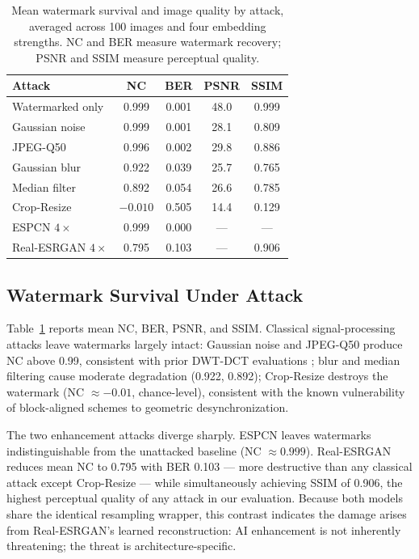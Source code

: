 \documentclass[conference]{IEEEtran}
\begin{document}
\begin{table}[t]
\caption{Mean watermark survival and image quality by attack, averaged
across 100 images and four embedding strengths. NC and BER measure
watermark recovery; PSNR and SSIM measure perceptual quality.}
\label{tab:survival}
\centering
\begin{tabular}{lcccc}
\toprule
Attack & NC & BER & PSNR & SSIM \\
\midrule
Watermarked only       & 0.999  & 0.001 & 48.0 & 0.999 \\
Gaussian noise         & 0.999  & 0.001 & 28.1 & 0.809 \\
JPEG-Q50               & 0.996  & 0.002 & 29.8 & 0.886 \\
Gaussian blur          & 0.922  & 0.039 & 25.7 & 0.765 \\
Median filter          & 0.892  & 0.054 & 26.6 & 0.785 \\
Crop-Resize            & $-0.010$ & 0.505 & 14.4 & 0.129 \\
ESPCN $4\times$        & 0.999  & 0.000 & ---  & ---  \\
Real-ESRGAN $4\times$  & 0.795  & 0.103 & ---  & 0.906 \\
\bottomrule
\end{tabular}
\end{table}

\subsection{Watermark Survival Under Attack}
Table~\ref{tab:survival} reports mean NC, BER, PSNR, and SSIM.
Classical signal-processing attacks leave watermarks largely intact:
Gaussian noise and JPEG-Q50 produce NC above 0.99, consistent with prior
DWT-DCT evaluations \cite{alhaj2007}; blur and median filtering cause
moderate degradation (0.922, 0.892); Crop-Resize destroys the watermark
(NC $\approx -0.01$, chance-level), consistent with the known
vulnerability of block-aligned schemes to geometric desynchronization.

The two enhancement attacks diverge sharply. ESPCN leaves watermarks
indistinguishable from the unattacked baseline (NC $\approx 0.999$).
Real-ESRGAN reduces mean NC to 0.795 with BER 0.103 --- more destructive
than any classical attack except Crop-Resize --- while simultaneously
achieving SSIM of 0.906, the highest perceptual quality of any attack in
our evaluation. Because both models share the identical resampling
wrapper, this contrast indicates the damage arises from Real-ESRGAN's
learned reconstruction: AI enhancement is not inherently threatening;
the threat is architecture-specific.
\end{document}

